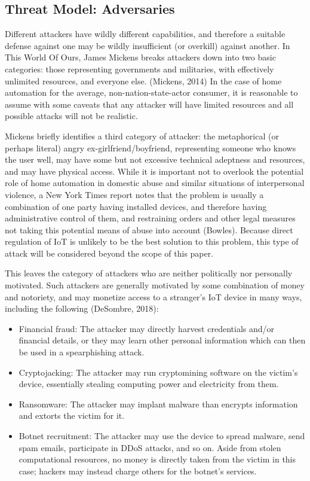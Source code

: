 \subsection{Threat Model: Adversaries}
Different attackers have wildly different capabilities, and therefore a suitable defense against one may be wildly insufficient (or overkill) against another. In This World Of Ours, James Mickens breaks attackers down into two basic categories: those representing governments and militaries, with effectively unlimited resources, and everyone else. (Mickens, 2014) In the case of home automation for the average, non-nation-state-actor consumer, it is reasonable to assume with some caveats that any attacker will have limited resources and all possible attacks will not be realistic. 

Mickens briefly identifies a third category of attacker: the metaphorical (or perhaps literal) angry ex-girlfriend/boyfriend, representing someone who knows the user well, may have some but not excessive technical adeptness and resources, and may have physical access. While it is important not to overlook the potential role of home automation in domestic abuse and similar situations of interpersonal violence, a New York Times report notes that the problem is usually a combination of one party having installed devices, and therefore having administrative control of them, and restraining orders and other legal measures not taking this potential means of abuse into account (Bowles). Because direct regulation of IoT is unlikely to be the best solution to this problem, this type of attack will be considered beyond the scope of this paper.

This leaves the category of attackers who are neither politically nor personally motivated. Such attackers are generally motivated by some combination of money and notoriety, and may monetize access to a stranger’s IoT device in many ways, including the following (DeSombre, 2018):
\begin{itemize}
\item Financial fraud: The attacker may directly harvest credentials and/or financial details, or they may learn other personal information which can then be used in a spearphishing attack.
\item Cryptojacking: The attacker may run cryptomining software on the victim’s device, essentially stealing computing power and electricity from them.
\item Ransomware: The attacker may implant malware than encrypts information and extorts the victim for it.
\item Botnet recruitment: The attacker may use the device to spread malware, send spam emails, participate in DDoS attacks, and so on. Aside from stolen computational resources, no money is directly taken from the victim in this case; hackers may instead charge others for the botnet’s services.
\end{itemize}

